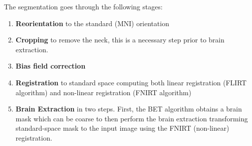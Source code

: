 \documentclass[11pt]{article}
\theoremstyle{definition}
\theoremstyle{remark}
\begin{document}
The segmentation goes through the following stages:
\begin{enumerate}  
  \item \textbf{Reorientation} to the standard (MNI) orientation
  \item \textbf{Cropping} to remove the neck, this is a necessary step prior to brain extraction. 
  \item \textbf{Bias field correction} 
  \item \textbf{Registration} to standard space computing both linear registration (FLIRT algorithm) and non-linear registration (FNIRT algorithm)
  \item \textbf{Brain Extraction} in two steps. First, the BET algorithm obtains a brain mask which can be coarse to then perform the brain extraction transforming standard-space mask to the input image using the FNIRT (non-linear) registration.

\end{enumerate}
\end{document}
